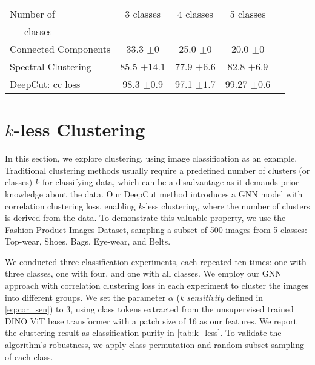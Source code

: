 \documentclass[10pt,twocolumn,letterpaper]{article}
\begin{document}
 \begin{table*}
  \centering
  \begin{tabular}{@{}l c c c c @{}}
    \toprule
    Number  of& 3 classes &4 classes&5 classes&\\
     \ \ \ classes  &                 &   \\

    \midrule
    Connected Components  & 33.3 $\pm 0$ & 25.0 $\pm 0$ & 20.0 $\pm 0$\\
    Spectral Clustering& 85.5 $\pm 14.1$ & 77.9 $\pm 6.6$ & 82.8 $\pm 6.9$ \\
    DeepCut: cc loss& 98.3 $\pm 0.9$  & 97.1 $\pm 1.7$ & 99.27 $\pm 0.6$  \\

    \bottomrule
  \end{tabular}
  \caption{\textbf{$k$-less clustering.} We apply DeepCut with correlation clustering loss on the Fashion Product Images Dataset\cite{Fashion_dataset}, using a subset of images from 5 classes: Top-wear, Shoes, Bags, Eye-wear, and Belts. We employ our $k$-less method and report the results as classification purity. The experiments are conducted with \emph{k sensitivity = 3} as defined in \cref{eq:cor_sen}. The presented results are the mean and standard deviation (\emph{std}) obtained from multiple experiments.
  }
  \label{tab:k_less}
\end{table*}




\section{$k$-less Clustering}\label{sec:k_les_l}
In this section, we explore clustering, using image classification as an example. Traditional clustering methods usually require a predefined number of clusters (or classes) $k$ for classifying data, which can be a disadvantage as it demands prior knowledge about the data. Our DeepCut method introduces a GNN model with correlation clustering loss, enabling $k$-less clustering, where the number of clusters is derived from the data. To demonstrate this valuable property, we use the Fashion Product Images Dataset\cite{Fashion_dataset}, sampling a subset of 500 images from 5 classes: Top-wear, Shoes, Bags, Eye-wear, and Belts.

We conducted three classification experiments, each repeated ten times: one with three classes, one with four, and one with all classes. We employ our GNN approach with correlation clustering loss in each experiment to cluster the images into different groups. We set the parameter \emph{$\alpha$} (\emph{k sensitivity} defined in \cref{eq:cor_sen}) to 3, using class tokens extracted from the unsupervised trained DINO\cite{caron2021emerging} ViT base transformer with a patch size of 16 as our features. We report the clustering result as classification purity in \cref{tab:k_less}. To validate the algorithm's robustness, we apply class permutation and random subset sampling of each class. 
\end{document}
